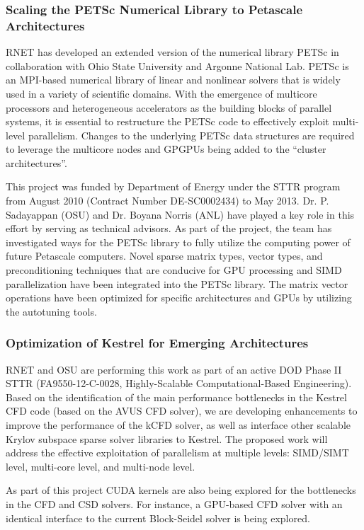 \subsubsection{Scaling the PETSc Numerical Library to Petascale Architectures}

RNET has developed an extended version of the numerical library PETSc \cite{Lowell1} in
collaboration with Ohio State University and Argonne National Lab. PETSc is an MPI-based numerical library of
linear and nonlinear solvers that is widely used in a variety of scientific domains. With the
emergence of multicore processors and heterogeneous accelerators as the building blocks of
parallel systems, it is essential to restructure the PETSc code to effectively exploit multi-level
parallelism. Changes to the underlying PETSc data structures are required to leverage the multicore
nodes and GPGPUs being added to the ``cluster architectures''.

This project was funded by Department of Energy under the STTR program from August 2010 (Contract Number DE-SC0002434) 
to May 2013. Dr. P. Sadayappan (OSU) and Dr. Boyana Norris (ANL) have played a key role in this effort by serving as 
technical advisors. As part of the project, the team has investigated ways for the PETSc library to fully utilize the 
computing power of future Petascale computers. Novel sparse matrix types,  vector types, and preconditioning techniques 
that are conducive for GPU processing and SIMD parallelization have been integrated into the PETSc library. The matrix 
vector operations have been optimized for specific architectures and GPUs by utilizing the autotuning tools.


\subsubsection{Optimization of Kestrel for Emerging Architectures}
RNET and OSU are performing this work as part of an active DOD Phase
II STTR (FA9550-12-C-0028, Highly-Scalable Computational-Based
Engineering). Based on the identification of the main performance
bottlenecks in the Kestrel CFD code (based on the AVUS CFD solver), we
are developing enhancements to improve the performance of the kCFD
solver, as well as interface other scalable Krylov subspace sparse
solver libraries to Kestrel. The proposed work will address the
effective exploitation of parallelism at multiple levels: SIMD/SIMT
level, multi-core level, and multi-node level.

As part of this project CUDA kernels are also being explored for the
bottlenecks in the CFD and CSD solvers. For instance, a GPU-based CFD
solver with an identical interface to the current Block-Seidel solver
is being explored.

